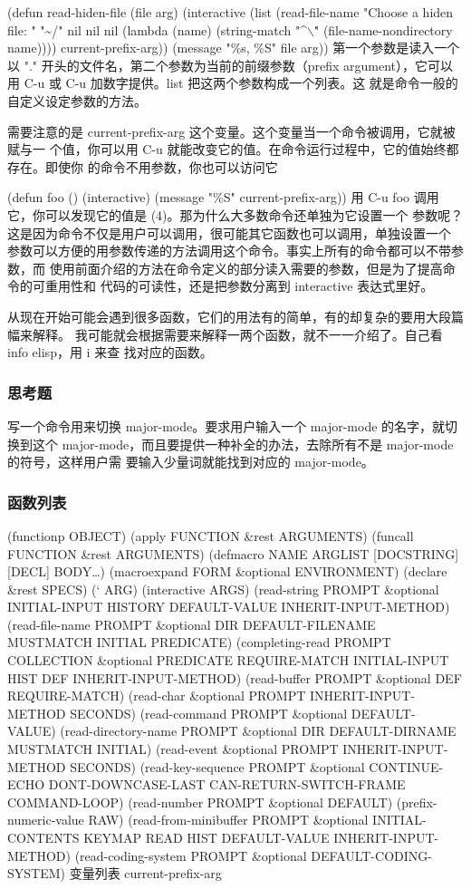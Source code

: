 \documentclass[11pt]{ctexart}
\begin{document}
{{{{(defun read-hiden-file (file arg)
(interactive
(list (read-file-name "Choose a hiden file: " "\textasciitilde{}/" nil nil nil
(lambda (name)
(string-match "\^{}$\backslash$\." (file-name-nondirectory name))))
current-prefix-arg))
(message "\%s, \%S" file arg))
第一个参数是读入一个以 "." 开头的文件名，第二个参数为当前的前缀参数（prefix
argument），它可以用 C-u 或 C-u 加数字提供。list 把这两个参数构成一个列表。这
就是命令一般的自定义设定参数的方法。

需要注意的是 current-prefix-arg 这个变量。这个变量当一个命令被调用，它就被赋与一
个值，你可以用 C-u 就能改变它的值。在命令运行过程中，它的值始终都存在。即使你
的命令不用参数，你也可以访问它

(defun foo ()
(interactive)
(message "\%S" current-prefix-arg))
用 C-u foo 调用它，你可以发现它的值是 (4)。那为什么大多数命令还单独为它设置一个
参数呢？这是因为命令不仅是用户可以调用，很可能其它函数也可以调用，单独设置一个
参数可以方便的用参数传递的方法调用这个命令。事实上所有的命令都可以不带参数，而
使用前面介绍的方法在命令定义的部分读入需要的参数，但是为了提高命令的可重用性和
代码的可读性，还是把参数分离到 interactive 表达式里好。

从现在开始可能会遇到很多函数，它们的用法有的简单，有的却复杂的要用大段篇幅来解释。
我可能就会根据需要来解释一两个函数，就不一一介绍了。自己看 info elisp，用 i 来查
找对应的函数。

\subsubsection{思考题}
\label{sec:orgd5675f6}
写一个命令用来切换 major-mode。要求用户输入一个 major-mode 的名字，就切换到这个
major-mode，而且要提供一种补全的办法，去除所有不是 major-mode 的符号，这样用户需
要输入少量词就能找到对应的 major-mode。

\subsubsection{函数列表}
\label{sec:orgfba98fe}
(functionp OBJECT)
(apply FUNCTION \&rest ARGUMENTS)
(funcall FUNCTION \&rest ARGUMENTS)
(defmacro NAME ARGLIST [DOCSTRING] [DECL] BODY\ldots{})
(macroexpand FORM \&optional ENVIRONMENT)
(declare \&rest SPECS)
(` ARG)
(interactive ARGS)
(read-string PROMPT \&optional INITIAL-INPUT HISTORY DEFAULT-VALUE
INHERIT-INPUT-METHOD)
(read-file-name PROMPT \&optional DIR DEFAULT-FILENAME MUSTMATCH
INITIAL PREDICATE)
(completing-read PROMPT COLLECTION \&optional PREDICATE
REQUIRE-MATCH INITIAL-INPUT HIST DEF
INHERIT-INPUT-METHOD)
(read-buffer PROMPT \&optional DEF REQUIRE-MATCH)
(read-char \&optional PROMPT INHERIT-INPUT-METHOD SECONDS)
(read-command PROMPT \&optional DEFAULT-VALUE)
(read-directory-name PROMPT \&optional DIR DEFAULT-DIRNAME
MUSTMATCH INITIAL)
(read-event \&optional PROMPT INHERIT-INPUT-METHOD SECONDS)
(read-key-sequence PROMPT \&optional CONTINUE-ECHO
DONT-DOWNCASE-LAST CAN-RETURN-SWITCH-FRAME
COMMAND-LOOP)
(read-number PROMPT \&optional DEFAULT)
(prefix-numeric-value RAW)
(read-from-minibuffer PROMPT \&optional INITIAL-CONTENTS KEYMAP
READ HIST DEFAULT-VALUE INHERIT-INPUT-METHOD)
(read-coding-system PROMPT \&optional DEFAULT-CODING-SYSTEM)
变量列表
current-prefix-arg
}}}}
\end{document}
